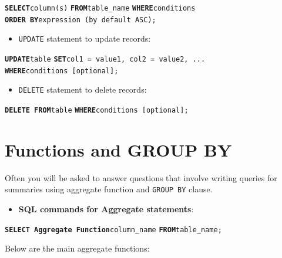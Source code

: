 \documentclass[
  letterpaper,
  DIV=11,
  numbers=noendperiod]{scrreprt}
\providecommand{\tightlist}{%
  \setlength{\itemsep}{0pt}\setlength{\parskip}{0pt}}\usepackage{longtable,booktabs,array}
\begin{document}
\textbf{\texttt{SELECT}}\texttt{column(s)}
\textbf{\texttt{FROM}}\texttt{table\_name}
\textbf{\texttt{WHERE}}\texttt{conditions}
\textbf{\texttt{ORDER\ BY}}\texttt{expression\ (by\ default\ ASC);}

\begin{itemize}
\tightlist
\item
  \texttt{UPDATE} statement to update records:
\end{itemize}

\textbf{\texttt{UPDATE}}\texttt{table}
\textbf{\texttt{SET}}\texttt{col1\ =\ value1,\ col2\ =\ value2,\ ...}
\textbf{\texttt{WHERE}}\texttt{conditions\ {[}optional{]};}

\begin{itemize}
\tightlist
\item
  \texttt{DELETE} statement to delete records:
\end{itemize}

\textbf{\texttt{DELETE\ FROM}}\texttt{table}
\textbf{\texttt{WHERE}}\texttt{conditions\ {[}optional{]};}

\hypertarget{functions-and-group-by}{%
\section*{Functions and GROUP BY}\label{functions-and-group-by}}


Often you will be asked to answer questions that involve writing queries
for summaries using aggregate function and \texttt{GROUP\ BY} clause.

\begin{itemize}
\tightlist
\item
  \textbf{SQL commands for Aggregate statements}:
\end{itemize}

\textbf{\texttt{SELECT\ Aggregate\ Function}}\texttt{column\_name}
\textbf{\texttt{FROM}}\texttt{table\_name;}

Below are the main aggregate functions:
\end{document}
